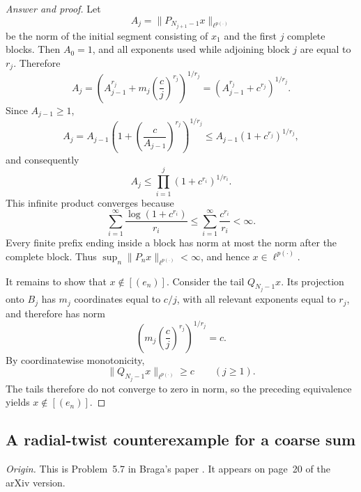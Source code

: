 \documentclass[11pt,reqno]{amsart}
\theoremstyle{plain}
\theoremstyle{definition}
\begin{document}
\begin{proof}[Answer and proof]
Let
\begin{equation*}
 A_j=\bigl\|P_{N_{j+1}-1}x\bigr\|_{\ell^{p(\cdot)}}
\end{equation*}
be the norm of the initial segment consisting of $x_1$ and the first $j$ complete blocks. Then $A_0=1$, and all exponents used while adjoining block $j$ are equal to $r_j$. Therefore
\begin{equation*}
    A_j =\left(A_{j-1}^{r_j}+m_j\left(\frac cj\right)^{r_j}\right)^{1/r_j} =\left(A_{j-1}^{r_j}+c^{r_j}\right)^{1/r_j}.
\end{equation*}
Since $A_{j-1}\geq1$,
\begin{equation*}
    A_j=A_{j-1}\left(1+\left(\frac c{A_{j-1}}\right)^{r_j}\right)^{1/r_j} \leq A_{j-1}(1+c^{r_j})^{1/r_j},
\end{equation*}
and consequently
\begin{equation*}
    A_j\leq\prod_{i=1}^j(1+c^{r_i})^{1/r_i}.
\end{equation*}
This infinite product converges because
\begin{equation*}
    \sum_{i=1}^\infty\frac{\log(1+c^{r_i})}{r_i} \leq\sum_{i=1}^\infty\frac{c^{r_i}}{r_i}<\infty.
\end{equation*}
Every finite prefix ending inside a block has norm at most the norm after the complete block. Thus $\sup_n\|P_nx\|_{\ell^{p(\cdot)}}<\infty$, and hence $x\in\ell^{p(\cdot)}$.

It remains to show that $x\notin[(e_n)]$. Consider the tail $Q_{N_j-1}x$. Its projection onto $B_j$ has $m_j$ coordinates equal to $c/j$, with all relevant exponents equal to $r_j$, and therefore has norm
\begin{equation*}
 \left(m_j\left(\frac cj\right)^{r_j}\right)^{1/r_j}=c.
\end{equation*}
By coordinatewise monotonicity,
\begin{equation*}
    \|Q_{N_j-1}x\|_{\ell^{p(\cdot)}}\geq c \qquad(j\geq1).
\end{equation*}
The tails therefore do not converge to zero in norm, so the preceding equivalence yields $x\notin[(e_n)]$.
\end{proof}

\subsection{A radial-twist counterexample for a coarse sum}
\label{sec:selected-radial-twist}

\noindent\textit{Origin.} This is Problem~5.7 in Braga's paper \cite{Braga2017Asymptotic}. It appears on page~20 of the arXiv version.
\end{document}
